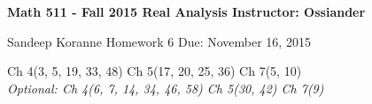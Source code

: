 \documentclass{article}
\begin{document}
\thispagestyle{empty}

\textbf{Math 511 - Fall 2015 \hfill Real Analysis  \hfill Instructor: Ossiander}

\hrulefill 
\medskip 

 {Sandeep Koranne \hfill  Homework 6 \hfill Due: November 16, 2015}
 \begin{center}
Ch 4(3, 5, 19, 33, 48) \quad Ch 5(17, 20, 25, 36) \quad Ch 7(5, 10)\\ \textit{Optional:  Ch 4(6, 7, 14, 34, 46, 58) \quad Ch 5(30, 42) \quad Ch 7(9)}
 \end{center}
\medskip
\end{document}
